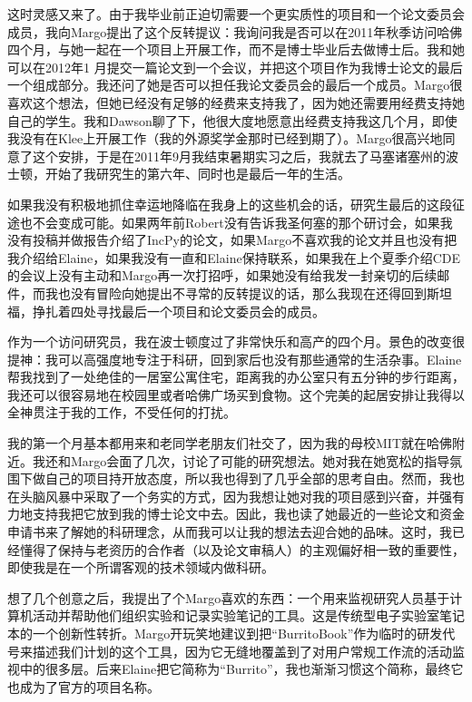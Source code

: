 \documentclass[letter,12pt]{book}
\begin{document}
\begin{CJK}{UTF8}{gbsn}
这时灵感又来了。由于我毕业前正迫切需要一个更实质性的项目和一个论文委员会成员，我向Margo提出了这个反转提议：我询问我是否可以在2011年秋季访问哈佛四个月，与她一起在一个项目上开展工作，而不是博士毕业后去做博士后。我和她可以在2012年1 月提交一篇论文到一个会议，并把这个项目作为我博士论文的最后一个组成部分。我还问了她是否可以担任我论文委员会的最后一个成员。Margo很喜欢这个想法，但她已经没有足够的经费来支持我了，因为她还需要用经费支持她自己的学生。我和Dawson聊了下，他很大度地愿意出经费支持我这几个月，即使我没有在Klee上开展工作（我的外源奖学金那时已经到期了）。Margo很高兴地同意了这个安排，于是在2011年9月我结束暑期实习之后，我就去了马塞诸塞州的波士顿，开始了我研究生的第六年、同时也是最后一年的生活。

如果我没有积极地抓住幸运地降临在我身上的这些机会的话，研究生最后的这段征途也不会变成可能。如果两年前Robert没有告诉我圣何塞的那个研讨会，如果我没有投稿并做报告介绍了IncPy的论文，如果Margo不喜欢我的论文并且也没有把我介绍给Elaine，如果我没有一直和Elaine保持联系，如果我在上个夏季介绍CDE的会议上没有主动和Margo再一次打招呼，如果她没有给我发一封亲切的后续邮件，而我也没有冒险向她提出不寻常的反转提议的话，那么我现在还得回到斯坦福，挣扎着四处寻找最后一个项目和论文委员会的成员。

\breakline

作为一个访问研究员，我在波士顿度过了非常快乐和高产的四个月。景色的改变很提神：我可以高强度地专注于科研，回到家后也没有那些通常的生活杂事。Elaine帮我找到了一处绝佳的一居室公寓住宅，距离我的办公室只有五分钟的步行距离，我还可以很容易地在校园里或者哈佛广场买到食物。这个完美的起居安排让我得以全神贯注于我的工作，不受任何的打扰。

我的第一个月基本都用来和老同学老朋友们社交了，因为我的母校MIT就在哈佛附近。我还和Margo会面了几次，讨论了可能的研究想法。她对我在她宽松的指导氛围下做自己的项目持开放态度，所以我也得到了几乎全部的思考自由。然而，我也在头脑风暴中采取了一个务实的方式，因为我想让她对我的项目感到兴奋，并强有力地支持我把它放到我的博士论文中去。因此，我也读了她最近的一些论文和资金申请书来了解她的科研理念，从而我可以让我的想法去迎合她的品味。这时，我已经懂得了保持与老资历的合作者（以及论文审稿人）的主观偏好相一致的重要性，即使我是在一个所谓客观的技术领域内做科研。

想了几个创意之后，我提出了个Margo喜欢的东西：一个用来监视研究人员基于计算机活动并帮助他们组织实验和记录实验笔记的工具。这是传统型电子实验室笔记本的一个创新性转折。Margo开玩笑地建议到把“BurritoBook”作为临时的研发代号来描述我们计划的这个工具，因为它无缝地覆盖到了对用户常规工作流的活动监视中的很多层。后来Elaine把它简称为“Burrito”，我也渐渐习惯这个简称，最终它也成为了官方的项目名称。


\end{CJK}
\end{document}
